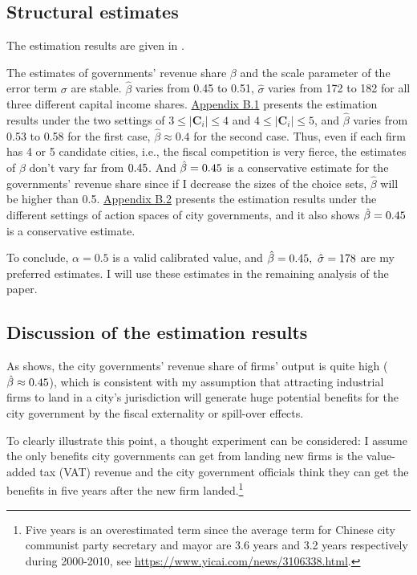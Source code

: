 \subsection{Structural estimates}
The estimation results are given in .


The estimates of governments'
revenue share $\beta$ and the scale parameter of the error term $\sigma$ are stable.
$\hat{\beta}$ varies from 0.45 to 0.51, $\hat{\sigma}$ varies from 172 to 182
for all three different capital income shares.
\hyperref[sec:robustness checks 1]{Appendix B.1}
presents the estimation results under the two settings of $3 \leq |\mathbf{C}_i| \leq 4$ and
$4 \leq |\mathbf{C}_i| \leq 5$, and $\hat{\beta}$ varies from 0.53 to 0.58 for the first case,
$\hat{\beta} \approx 0.4$ for the second case. Thus, even if each firm has
4 or 5 candidate cities, i.e., the fiscal competition is very fierce,
the estimates of $\beta$ don't vary far from $0.45$. And $\hat{\beta} = 0.45$
is a conservative estimate for the governments' revenue share since if I decrease the sizes of
the choice sets, $\hat{\beta}$ will be higher than 0.5.
\hyperref[sec:robustness checks 2]{Appendix B.2} presents the estimation results under the
different settings of action spaces of city governments,
and it also shows $\hat{\beta} = 0.45$ is a conservative estimate.

To conclude, $\alpha=0.5$ is a valid calibrated value,
and $\hat{\beta} = 0.45, ~\hat{\sigma} = 178$ are my preferred estimates.
I will use these estimates in the remaining analysis of the paper.



\subsection{Discussion of the estimation results}
\label{subsec:discussion of results}
As  shows,
the city governments' revenue share of firms' output is quite high
($\hat{\beta} \approx 0.45$),
which is consistent with my assumption that attracting industrial firms
to land in a city's jurisdiction will generate huge potential benefits for the city government
by the fiscal externality or spill-over effects.

To clearly illustrate this point, a thought experiment can be considered:
I assume the only benefits city governments can get from landing new firms
is the value-added tax (VAT) revenue and
the city government officials think they can get the benefits in five years
after the new firm landed.\footnote{
    Five years is an overestimated term since the average term for
    Chinese city communist party secretary and mayor are 3.6 years and 3.2 years respectively
    during 2000-2010, see \url{https://www.yicai.com/news/3106338.html}.}


